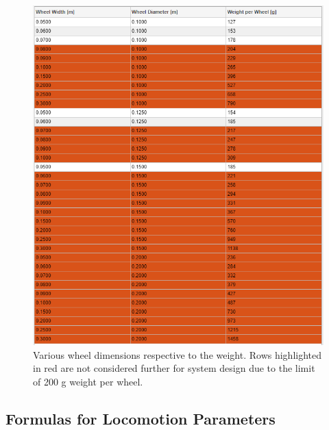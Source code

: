 \begin{figure}[htb] 
  \centering
     \includegraphics[width=1\textwidth]{Media/Dimensions-WeightLimits.png}
  \caption{Various wheel dimensions respective to the weight. Rows highlighted in red are not considered further for system design due to the limit of 200 g weight per wheel.}
  \label{fig:DimensionsLoco}
\end{figure}

\subsection{Formulas for Locomotion Parameters}
\label{app:FormulasLoco}

\clearpage

\setcounter{figure}{0}
\setcounter{table}{0}

